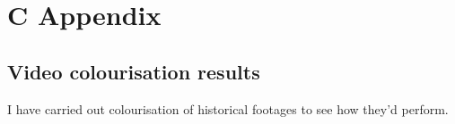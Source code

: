



\chapter*{C Appendix}
\section*{Video colourisation results}
I have carried out colourisation of historical footages to see how they'd perform.


